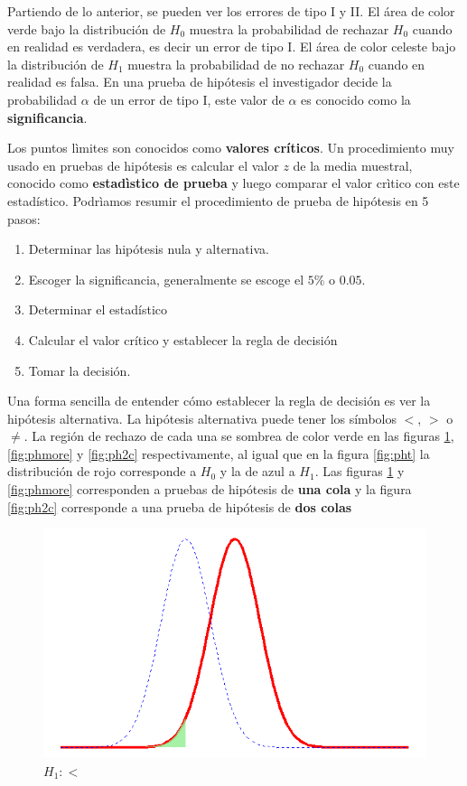 \documentclass[]{book}
\providecommand{\tightlist}{%
  \setlength{\itemsep}{0pt}\setlength{\parskip}{0pt}}
\begin{document}
Partiendo de lo anterior, se pueden ver los errores de tipo I y II. El área de color verde bajo la distribución de \(H_0\) muestra la probabilidad de rechazar \(H_0\) cuando en realidad es verdadera, es decir un error de tipo I. El área de color celeste bajo la distribución de \(H_1\) muestra la probabilidad de no rechazar \(H_0\) cuando en realidad es falsa. En una prueba de hipótesis el investigador decide la probabilidad \(\alpha\) de un error de tipo I, este valor de \(\alpha\) es conocido como la \textbf{significancia}.

Los puntos lìmites son conocidos como \textbf{valores críticos}. Un procedimiento muy usado en pruebas de hipótesis es calcular el valor \(z\) de la media muestral, conocido como \textbf{estadìstico de prueba} y luego comparar el valor crìtico con este estadístico. Podrìamos resumir el procedimiento de prueba de hipótesis en 5 pasos:

\begin{enumerate}
\def\labelenumi{\arabic{enumi}.}
\tightlist
\item
  Determinar las hipótesis nula y alternativa.
\item
  Escoger la significancia, generalmente se escoge el \(5\%\) o \(0.05\).
\item
  Determinar el estadístico
\item
  Calcular el valor crítico y establecer la regla de decisión
\item
  Tomar la decisión.
\end{enumerate}

Una forma sencilla de entender cómo establecer la regla de decisión es ver la hipótesis alternativa. La hipótesis alternativa puede tener los símbolos \(<\), \(>\) o \(\neq\). La región de rechazo de cada una se sombrea de color verde en las figuras \ref{fig:phless}, \ref{fig:phmore} y \ref{fig:ph2c} respectivamente, al igual que en la figura \ref{fig:pht} la distribución de rojo corresponde a \(H_0\) y la de azul a \(H_1\). Las figuras \ref{fig:phless} y \ref{fig:phmore} corresponden a pruebas de hipótesis de \textbf{una cola} y la figura \ref{fig:ph2c} corresponde a una prueba de hipótesis de \textbf{dos colas}

\begin{figure}[h]

{\centering \includegraphics[width=0.5\linewidth]{phless} 

}

\caption{$H_1:<$}\label{fig:phless}
\end{figure}
\end{document}
